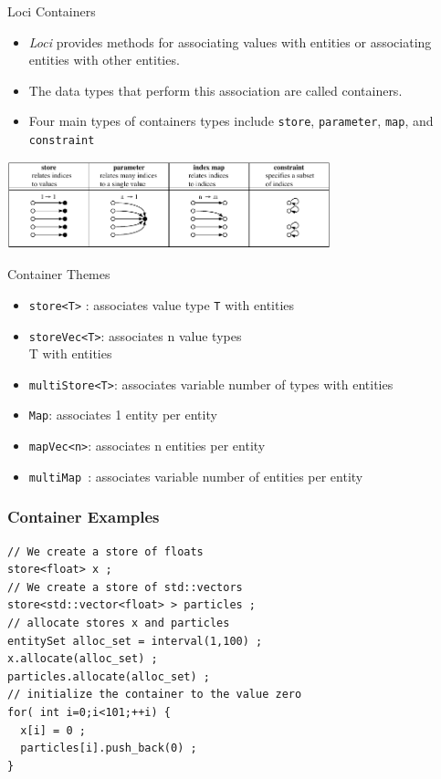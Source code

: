 \documentclass{beamer}
\begin{document}
\begin{frame}{Loci Containers}
\begin{itemize}
\item {\it Loci} provides methods for associating values with entities or associating entities with other entities.
\item The data types that perform this association are called containers.
\item Four main types of containers types include {\tt store}, {\tt parameter}, {\tt map}, and {\tt constraint}
\end{itemize}
\begin{center}
\includegraphics[height=1in]{Figures/constructs}
\end{center}
\end{frame}

\begin{frame}{Container Themes}
\begin{itemize}
\item {\tt store<T>} : associates value type {\tt T} with entities
\item {\tt storeVec<T>}: associates n value types {\\ T} with entities
\item {\tt multiStore<T>}: associates variable number of types with entities
\item {\tt Map}: associates 1 entity per entity
\item {\tt mapVec<n>}: associates n entities per entity
\item {\tt multiMap }: associates variable number of entities per entity
\end{itemize}
\end{frame}

\begin{frame}[fragile=singleslide]\frametitle{Container Examples}
\begin{verbatim}
// We create a store of floats
store<float> x ;
// We create a store of std::vectors
store<std::vector<float> > particles ;
// allocate stores x and particles
entitySet alloc_set = interval(1,100) ;
x.allocate(alloc_set) ;
particles.allocate(alloc_set) ;
// initialize the container to the value zero
for( int i=0;i<101;++i) {
  x[i] = 0 ;
  particles[i].push_back(0) ; 
}
\end{verbatim}
\end{frame}
\end{document}
